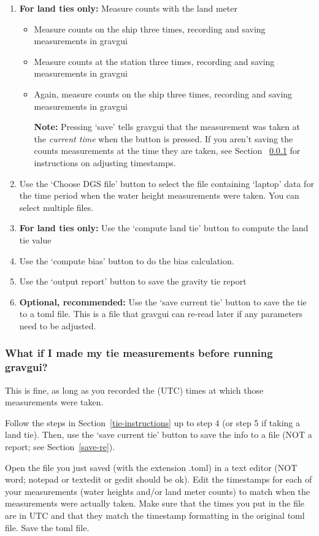 \documentclass{pfpe-manual}
\begin{document}
\begin{enumerate}
\begin{itemize}
    \end{itemize}
\item \textbf{For land ties only:} Measure counts with the land meter
    \begin{itemize}
    \item Measure counts on the ship three times, recording and saving measurements in gravgui
    \item Measure counts at the station three times, recording and saving measurements in gravgui
    \item Again, measure counts on the ship three times, recording and saving measurements in gravgui
    \item[\textbf{Note:}] Pressing `save' tells gravgui that the measurement was taken at the \textit{current time} when the button is pressed. If you aren't saving the counts measurements at the time they are taken, see Section ~\ref{later} for instructions on adjusting timestamps.
    \end{itemize}
\item Use the `Choose DGS file' button to select the file containing `laptop' data for the time period when the water height measurements were taken. You can select multiple files.
\item \textbf{For land ties only:} Use the `compute land tie' button to compute the land tie value
\item Use the `compute bias' button to do the bias calculation.
\item Use the `output report' button to save the gravity tie report
\item \textbf{Optional, recommended:} Use the `save current tie' button to save the tie to a toml file. This is a file that gravgui can re-read later if any parameters need to be adjusted.
\end{enumerate}

\subsubsection{What if I made my tie measurements before running gravgui?}
\label{later}
This is fine, as long as you recorded the (UTC) times at which those measurements were taken.

Follow the steps in Section~\ref{tie-instructions} up to step 4 (or step 5 if taking a land tie). Then, use the `save current tie' button to save the info to a file (NOT a report; see Section~\ref{save-re}). 

Open the file you just saved (with the extension .toml) in a text editor (NOT word; notepad or textedit or gedit should be ok). Edit the timestamps for each of your measurements (water heights and/or land meter counts) to match when the measurements were actually taken. Make sure that the times you put in the file are in UTC and that they match the timestamp formatting in the original toml file. Save the toml file. 
\end{document}
